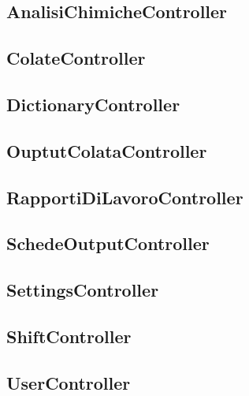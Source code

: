  \subsection{AnalisiChimicheController}
  \subsection{ColateController}
  \subsection{DictionaryController}
  \subsection{OuptutColataController}
  \subsection{RapportiDiLavoroController}
  \subsection{SchedeOutputController}
  \subsection{SettingsController}
  \subsection{ShiftController}
  \subsection{UserController}